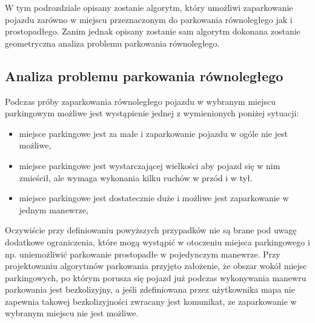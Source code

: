 \documentclass[a4paper,11pt,twoside]{report}
\theoremstyle{definition}
\begin{document}
W tym podrozdziale opisany zostanie algorytm, który umożliwi zaparkowanie pojazdu zarówno w miejscu przeznaczonym do parkowania równoległego jak i prostopadłego. Zanim jednak opisany zostanie sam algorytm dokonana zostanie geometryczna analiza problemu parkowania równoległego.

\subsection{Analiza problemu parkowania równoległego}

Podczas próby zaparkowania równoległego pojazdu w wybranym miejscu parkingowym możliwe jest wystąpienie jednej z wymienionych poniżej sytuacji:
\begin{itemize}
	\item miejsce parkingowe jest za małe i zaparkowanie pojazdu w ogóle nie jest możliwe,
	\item miejsce parkingowe jest wystarczającej wielkości aby pojazd się w nim zmieścił, ale wymaga wykonania kilku ruchów w przód i w tył.	
	\item miejsce parkingowe jest dostatecznie duże i możliwe jest zaparkowanie w jednym manewrze,
\end{itemize}

Oczywiście przy definiowaniu powyższych przypadków nie są brane pod uwagę dodatkowe ograniczenia, które mogą wystąpić w otoczeniu miejsca parkingowego i np. uniemożliwić parkowanie prostopadłe w pojedynczym manewrze. Przy projektowaniu algorytmów parkowania przyjęto założenie, że obszar wokół miejsc parkingowych, po którym porusza się pojazd już podczas wykonywania manewru parkowania jest bezkolizyjny, a jeśli zdefiniowana przez użytkownika mapa nie zapewnia takowej bezkolizyjności zwracany jest komunikat, ze zaparkowanie w wybranym miejscu nie jest możliwe. 
\end{document}

